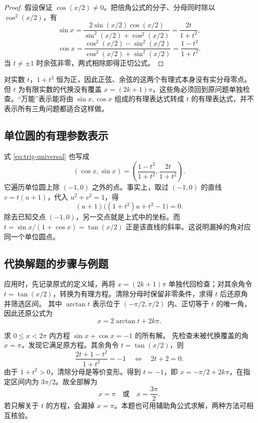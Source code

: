 \documentclass[UTF8]{ctexart}
\begin{document}
\begin{proof}
假设保证 $\cos(x/2)\ne0$。把倍角公式的分子、分母同时除以 $\cos^2(x/2)$，有
\[
  \sin x=
  \frac{2\sin(x/2)\cos(x/2)}{\sin^2(x/2)+\cos^2(x/2)}
  =\frac{2t}{1+t^2},
\]
\[
  \cos x=
  \frac{\cos^2(x/2)-\sin^2(x/2)}{\cos^2(x/2)+\sin^2(x/2)}
  =\frac{1-t^2}{1+t^2}.
\]
当 $t\ne\pm1$ 时余弦非零，两式相除即得正切公式。
\end{proof}

对实数 $t$，$1+t^2$ 恒为正，因此正弦、余弦的这两个有理式本身没有实分母零点。但 $t$ 为有限实数的代换没有覆盖 $x=(2k+1)\pi$，这些角必须回到原问题单独检查。“万能”表示能将由 $\sin x,\cos x$ 组成的有理表达式转成 $t$ 的有理表达式，并不表示所有三角问题都适合这样做。

\subsection{单位圆的有理参数表示}

式 \eqref{eq:trig-universal} 也写成
\[
  (\cos x,\sin x)=\left(\frac{1-t^2}{1+t^2},\frac{2t}{1+t^2}\right).
\]
它遍历单位圆上除 $(-1,0)$ 之外的点。事实上，取过 $(-1,0)$ 的直线 $v=t(u+1)$，代入 $u^2+v^2=1$，得
\[
  (u+1)\bigl((1+t^2)u+t^2-1\bigr)=0.
\]
除去已知交点 $(-1,0)$，另一交点就是上式中的坐标。而 $t=\sin x/(1+\cos x)=\tan(x/2)$ 正是该直线的斜率。这说明漏掉的角对应同一个单位圆点。

\subsection{代换解题的步骤与例题}

应用时，先记录原式的定义域，再将 $x=(2k+1)\pi$ 单独代回检查；对其余角令 $t=\tan(x/2)$，转换为有理方程。清除分母时保留非零条件，求得 $t$ 后还原角并筛选区间。
其中 $\arctan t$ 表示位于 $(-\pi/2,\pi/2)$ 内、正切等于 $t$ 的唯一角，因此还原公式为
\begin{equation}\label{eq:trig-t-back}
  x=2\arctan t+2k\pi.
\end{equation}

\begin{example}[万能代换与遗漏角的检查]
求 $0\le x<2\pi$ 内方程 $\sin x+\cos x=-1$ 的所有解。
先检查未被代换覆盖的角 $x=\pi$，发现它满足原方程。其余角令 $t=\tan(x/2)$，则
\[
  \frac{2t+1-t^2}{1+t^2}=-1
  \quad\Longleftrightarrow\quad 2t+2=0.
\]
由于 $1+t^2>0$，清除分母是等价变形。得到 $t=-1$，即 $x=-\pi/2+2k\pi$，在指定区间内为 $3\pi/2$。故全部解为
\[
  x=\pi\quad\text{或}\quad x=\frac{3\pi}{2}.
\]
若只解关于 $t$ 的方程，会漏掉 $x=\pi$。本题也可用辅助角公式求解，两种方法可相互核验。
\end{example}
\end{document}
